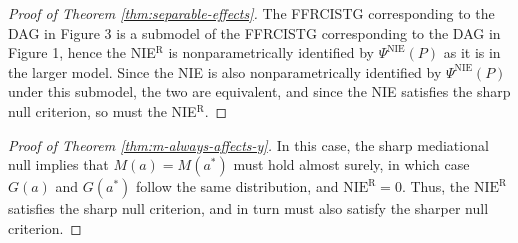 \documentclass[12pt]{article}
\begin{document}
\begin{proof}[Proof of Theorem \ref{thm:separable-effects}]
    The FFRCISTG corresponding to the DAG in Figure 3 is a submodel of the FFRCISTG corresponding to the DAG in Figure 1, hence the NIE$^{\text{R}}$ is nonparametrically identified by $\Psi^{\text{NIE}}(P)$ as it is in the larger model. Since the NIE is also nonparametrically identified by $\Psi^{\text{NIE}}(P)$ under this submodel, the two are equivalent, and since the NIE satisfies the sharp null criterion, so must the NIE$^{\text{R}}$.
\end{proof}

\begin{proof}[Proof of Theorem \ref{thm:m-always-affects-y}]
    In this case, the sharp mediational null implies that $M(a)=M(a^*)$ must hold almost surely, in which case $G(a)$ and $G(a^*)$ follow the same distribution, and $\text{NIE}^{\text{R}}=0$. Thus, the $\text{NIE}^{\text{R}}$ satisfies the sharp null criterion, and in turn must also satisfy the sharper null criterion.
\end{proof}


%


\end{document}
